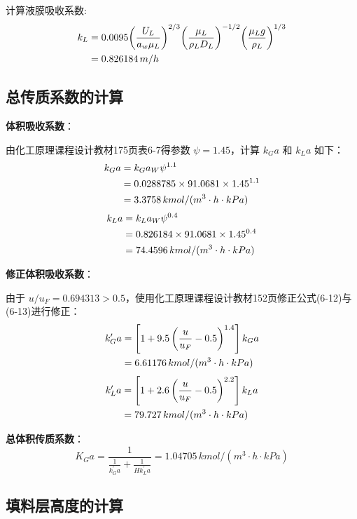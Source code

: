 计算液膜吸收系数:
\begin{align}
	k_{L}
	&= 0.0095\biggl(\frac{U_{L}}{a_{w}\mu_{L}}\biggr)^{2/3}\biggl(\frac{\mu_{L}}{\rho_{L}D_{L}}\biggr)^{-1/2}\biggl(\frac{\mu_{L}g}{\rho_{L}}\biggr)^{1/3} \\
	&=
	0.826184 \, m/h \notag
\end{align}

\subsection{总传质系数的计算}

\textbf{体积吸收系数}：

由化工原理课程设计教材175页表6-7得参数 $\psi = 1.45$，计算 $k_Ga$ 和 $k_La$ 如下：
\begin{align}
	k_{G}a
	&= k_{G}a_{W} \psi^{1.1} \\
	&= 0.0288785 \times 91.0681 \times 1.45^{1.1} \notag \\
	&= 3.3758 \, kmol/(m^3 \cdot h \cdot kPa) \notag
\end{align}
\begin{align}
	k_{L}a
	&= k_{L}a_{W} \psi^{0.4} \\
	&= 0.826184 \times 91.0681 \times 1.45^{0.4} \notag \\
	&= 74.4596 \, kmol/(m^3 \cdot h \cdot kPa) \notag
\end{align}

\textbf{修正体积吸收系数}：

由于 $u/u_F = 0.694313 > 0.5$，使用化工原理课程设计教材152页修正公式(6-12)与(6-13)进行修正：
\begin{align}
	k_{G}^{\prime}a
	&= \left[1 + 9.5 \left(\frac{u}{u_{F}} - 0.5\right)^{1.4}\right] k_{G}a \\
	&= 6.61176 \, kmol/(m^3 \cdot h \cdot kPa) \notag
\end{align}
\begin{align}
	k_{L}^{\prime}a
	&= \left[1 + 2.6 \left(\frac{u}{u_{F}} - 0.5\right)^{2.2}\right] k_{L}a \\
	&= 79.727 \, kmol/(m^3 \cdot h \cdot kPa) \notag
\end{align}

\textbf{总体积传质系数}：
\begin{equation}
	K_{G}a = \frac{1}{\frac{1}{k_{G}^{\prime}a} + \frac{1}{H k_{L}^{\prime}a}} = 1.04705 \, kmol/(m^3 \cdot h \cdot kPa)
\end{equation}

\subsection{填料层高度的计算}

